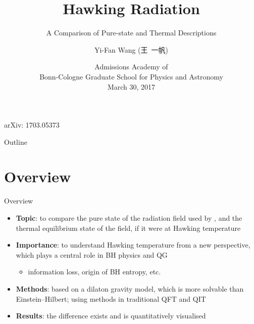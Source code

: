 \documentclass{beamer}
\title%
{Hawking Radiation}
\subtitle{A Comparison of Pure-state and Thermal Descriptions}
\author[Wang] %
{Yi-Fan Wang (王\ 一帆)}
\institute[Uni zu Köln, Uni Bonn] %
{
  Institut für Theoretische Physik, Universität zu Köln
  \and
  Rheinische Friedrich-Wilhelms-Universität Bonn}
\date[BCGS Admission 2017]
{Admissions Academy of\\Bonn-Cologne Graduate School for Physics and 
Astronomy\\March 30, 2017}
\begin{document}
\begin{frame}
  \titlepage
  arXiv: 1703.05373
\end{frame}

\begin{frame}{Outline}
  \tableofcontents
\end{frame}





\section{Overview}

\begin{frame}{Overview}
\begin{itemize}
\item \textbf{Topic}: to compare the \alert{pure state} of the radiation field 
used by \citeauthor{HAWKING1974}, and the \alert{thermal equilibrium state} of 
the field, if it were at Hawking temperature
\item \textbf{Importance}: to understand Hawking temperature from a new 
perspective, which plays a central role in BH physics and QG
\begin{itemize}
\item information loss, origin of BH entropy, etc.\
\end{itemize}
\item \textbf{Methods}: based on a dilaton gravity model, which is more 
solvable than Einstein--Hilbert; using methods in traditional QFT and QIT
\item \textbf{Results}: the difference exists and is quantitatively visualised
\end{itemize}

\end{frame}
\end{document}
